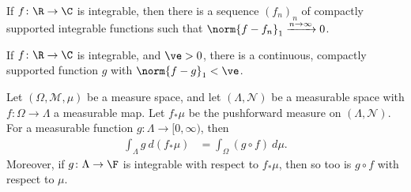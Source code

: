 \begin{corollary}
  If $f\colon \R\rightarrow\C$ is integrable, then there is a sequence $\left(f_n\right)_n$ of compactly supported integrable functions such that $\norm{f - f_n}_{1}\xrightarrow{n\rightarrow\infty} 0$.
\end{corollary}
\begin{theorem}
  If $f\colon \R\rightarrow\C$ is integrable, and $\ve > 0$, there is a continuous, compactly supported function $g$ with $\norm{f - g}_{1} < \ve$.
\end{theorem}
\begin{proposition}
  Let $\left(\Omega,\mathcal{M},\mu\right)$ be a measure space, and let $\left(\Lambda,\mathcal{N}\right)$ be a measurable space with $f\colon \Omega\rightarrow \Lambda$ a measurable map. Let $f_{\ast}\mu$ be the pushforward measure on $\left(\Lambda,\mathcal{N}\right)$. For a measurable function $g\colon \Lambda\rightarrow [0,\infty)$, then
  \begin{align*}
    \int_{\Lambda}^{} g\:d\left(f_{\ast}\mu\right) &= \int_{\Omega}^{} \left(g\circ f\right)\:d\mu.
  \end{align*}
  Moreover, if $g\colon \Lambda\rightarrow \F$ is integrable with respect to $f_{\ast}\mu$, then so too is $g\circ f$ with respect to $\mu$.
\end{proposition}
